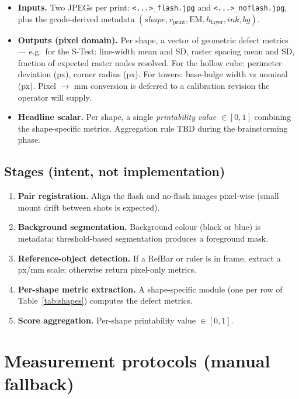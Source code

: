 \documentclass[11pt,a4paper]{article}
\begin{document}
\begin{itemize}[leftmargin=1.4em,itemsep=2pt]
\item \textbf{Inputs.} Two JPEGs per print:
\texttt{<...>\_flash.jpg} and \texttt{<...>\_noflash.jpg}, plus
the gcode-derived metadata $(shape, v_\mathrm{print},
\mathrm{EM}, h_\mathrm{layer}, ink, bg)$.
\item \textbf{Outputs (pixel domain).} Per shape, a vector of
geometric defect metrics --- e.g.\ for the S-Test: line-width
mean and SD, raster spacing mean and SD, fraction of expected
raster nodes resolved. For the hollow cube: perimeter
deviation (px), corner radius (px). For towers: base-bulge
width vs nominal (px). Pixel $\to$ mm conversion is deferred
to a calibration revision the operator will supply.
\item \textbf{Headline scalar.} Per shape, a single
\emph{printability value} $\in [0, 1]$ combining the
shape-specific metrics. Aggregation rule TBD during the
brainstorming phase.
\end{itemize}

\subsection{Stages (intent, not implementation)}

\begin{enumerate}[leftmargin=1.4em,itemsep=2pt]
\item \textbf{Pair registration.} Align the flash and no-flash
images pixel-wise (small mount drift between shots is expected).
\item \textbf{Background segmentation.} Background colour (black
or blue) is metadata; threshold-based segmentation produces a
foreground mask.
\item \textbf{Reference-object detection.} If a RefBar or ruler
is in frame, extract a px/mm scale; otherwise return pixel-only
metrics.
\item \textbf{Per-shape metric extraction.} A shape-specific
module (one per row of Table~\ref{tab:shapes}) computes the
defect metrics.
\item \textbf{Score aggregation.} Per-shape printability value
$\in [0,1]$.
\end{enumerate}

\section{Measurement protocols (manual fallback)}
\label{sec:measure}
\end{document}
